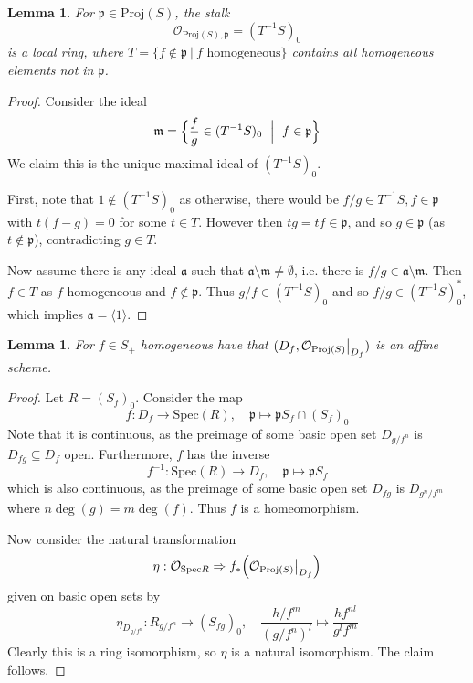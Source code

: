\documentclass{scrartcl}
\newcommand{\p}{\mathfrak{p}}
\newcommand{\m}{\mathfrak{m}}
\renewcommand{\a}{\mathfrak{a}}
\renewcommand{\m}{\mathfrak{m}}
\newcommand{\Spec}{\mathrm{Spec}}
\newcommand{\Proj}{\mathrm{Proj}}
\renewcommand{\O}{\mathcal{O}}
\newcommand\restr[2]{{
    \left.\kern-\nulldelimiterspace
    #1
    \vphantom{\big|}
    \right|_{#2}
}}
\newtheorem{lemma}[prop]{Lemma}
\theoremstyle{definition}
\begin{document}
\begin{lemma}
    For $\p \in \Proj(S)$, the stalk
    \begin{equation*}
        \O_{\Proj(S), \p} = (T^{-1}S)_0
    \end{equation*}
    is a local ring, where $T = \{ f \notin \p \ | \ \text{$f$ homogeneous}\}$ contains all homogeneous elements not in $\p$.
\end{lemma}
\begin{proof}
    Consider the ideal
    \begin{equation*}
        \m = \Bigl\{ \frac f g \in (T^{-1}S)_0 \ \Bigm| \ f \in \p \Bigr\}
    \end{equation*}
    We claim this is the unique maximal ideal of $(T^{-1}S)_0$.

    First, note that $1 \notin (T^{-1}S)_0$ as otherwise, there would be $f/g \in T^{-1}S, f \in \p$ with $t(f - g) = 0$ for some $t \in T$.
    However then $tg = tf \in \p$, and so $g \in \p$ (as $t \notin \p$), contradicting $g \in T$.
    
    Now assume there is any ideal $\a$ such that $\a \setminus \m \neq \emptyset$, i.e. there is $f/g \in \a \setminus \m$.
    Then $f \in T$ as $f$ homogeneous and $f \notin \p$.
    Thus $g/f \in (T^{-1}S)_0$ and so $f/g \in (T^{-1}S)_0^*$, which implies $\a = \langle 1 \rangle$.
\end{proof}
\begin{lemma}
    \label{prop:Df_affine}
    For $f \in S_+$ homogeneous have that $(D_f, \restr{\O_{\Proj(S)}}{D_f})$ is an affine scheme.
\end{lemma}
\begin{proof}
    Let $R = (S_f)_0$.
    Consider the map
    \begin{equation*}
        f: D_f \to \Spec(R), \quad \p \mapsto \p S_f \cap (S_f)_0
    \end{equation*}
    Note that it is continuous, as the preimage of some basic open set $D_{g/f^n}$ is $D_{fg} \subseteq D_f$ open.
    Furthermore, $f$ has the inverse
    \begin{equation*}
        f^{-1}: \Spec(R) \to D_f, \quad \p \mapsto \p S_f
    \end{equation*}
    which is also continuous, as the preimage of some basic open set $D_{fg}$ is $D_{g^n/f^m}$ where $n\deg(g) = m\deg(f)$.
    Thus $f$ is a homeomorphism.

    Now consider the natural transformation
    \begin{equation*}
        \eta: \O_{\Spec R} \Rightarrow f_*\Bigl( \restr{\O_{\Proj(S)}}{D_f} \Bigr)
    \end{equation*}
    given on basic open sets by
    \begin{equation*}
        \eta_{D_{g/f^n}}: R_{g/f^n} \to (S_{fg})_0, \quad \frac {h/f^m} {(g/f^n)^l} \mapsto \frac {h f^{nl}} {g^l f^m}
    \end{equation*}
    Clearly this is a ring isomorphism, so $\eta$ is a natural isomorphism.
    The claim follows.
\end{proof}
\end{document}
